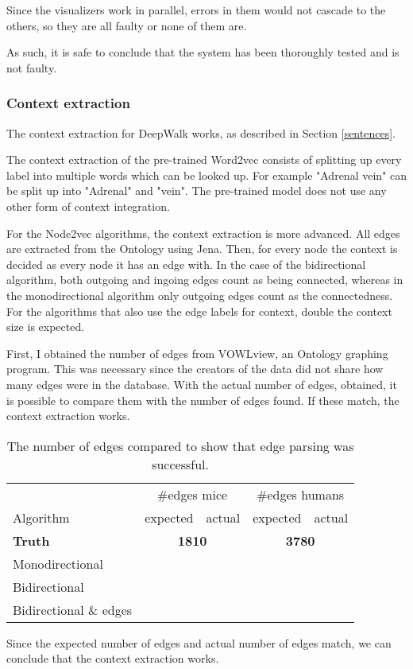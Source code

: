 \documentclass{article}
\begin{document}
  Since the visualizers work in parallel, errors in them would not cascade to the others, so they are all faulty or none of them are.
  
  As such, it is safe to conclude that the system has been thoroughly tested and is not faulty.
  \subsubsection{Context extraction}
  The context extraction for DeepWalk works, as described in Section \ref{sentences}.
  
  The context extraction of the pre-trained Word2vec consists of splitting up every label into multiple words which can be looked up. For example "Adrenal vein" can be split up into "Adrenal" and "vein".
  The pre-trained model does not use any other form of context integration.
  
  For the Node2vec algorithms, the context extraction is more advanced. All edges are extracted from the Ontology using Jena. Then, for every node the context is decided as every node it has an edge with. In the case of the bidirectional algorithm, both outgoing and ingoing edges count as being connected, whereas in the monodirectional algorithm only outgoing edges count as the connectedness. For the algorithms that also use the edge labels for context, double the context size is expected.
  
  First, I obtained the number of edges from VOWLview\cite{vowlview}, an Ontology graphing program. This was necessary since the creators of the data did not share how many edges were in the database. With the actual number of edges, obtained, it is possible to compare them with the number of edges found. If these match, the context extraction works.
  \begin{table}[H]
  \begin{tabular}{l|ll|ll}
  & \multicolumn{2}{c}{\#edges mice} & \multicolumn{2}{c|}{\#edges humans}\\
  Algorithm & expected & actual & expected & actual\\
  \hline
  \textbf{Truth}\cite{mice_ontology} & \multicolumn{2}{c|}{\textbf{1810}} & \multicolumn{2}{c}{\textbf{3780}} \\
  Monodirectional & & & &\\
  Bidirectional & & & &\\
  Bidirectional \& edges & & & &\\
  \end{tabular}
  \caption{The number of edges compared to show that edge parsing was successful.}
  \label{edgecounts}
  \end{table}
  Since the expected number of edges and actual number of edges match, we can conclude that the context extraction works.
  
\end{document}
